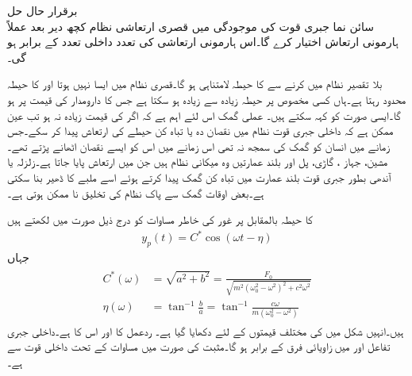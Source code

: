 \quad برقرار حال حل\\
سائن نما جبری قوت کی موجودگی میں قصری ارتعاشی نظام کچھ دیر  بعد عملاً ہارمونی ارتعاش اختیار کرے گا۔اس ہارمونی ارتعاشی کی تعدد داخلی تعدد کے برابر ہو گی۔

بلا تقصیر نظام میں   کرنے سے   کا حیطہ لامتناہی ہو گا۔قصری نظام میں ایسا نہیں ہوتا اور  کا حیطہ محدود رہتا ہے۔ہاں کسی مخصوص  پر حیطہ زیادہ سے زیادہ ہو سکتا ہے جس کا دارومدار  کی قیمت پر ہو گا۔ایسی صورت کو  کہہ سکتے ہیں۔ عملی گمک اس لئے اہم ہے کہ اگر  کی قیمت زیادہ نہ ہو تب عین ممکن ہے کہ داخلی  جبری قوت نظام میں نقصان دہ یا  تباہ کن حیطے کی ارتعاش پیدا کر سکے۔جس زمانے میں انسان کو گمک کی سمجھ نہ تھی اس زمانے میں اس کو ایسے نقصان اٹھانے پڑتے تھے۔مشین، جہاز ، گاڑی، پل اور بلند عمارتیں وہ میکانی نظام ہیں جن میں ارتعاش پایا جاتا ہے۔زلزلہ یا آندھی بطور جبری قوت  بلند عمارت میں تباہ کن گمک پیدا کرتے ہوئے اسے ملبے کا ڈھیر بنا سکتی ہے۔بعض اوقات گمک سے پاک نظام کی تخلیق نا ممکن ہوتی ہے۔

 کا حیطہ بالمقابل  پر غور کی خاطر مساوات  کو درج ذیل صورت میں لکھتے ہیں
\begin{align}\label{مساوات_سادہ_دو_برقرار_عملی_گمک_الف}
y_p(t)=C^* \cos(\omega t-\eta)
\end{align}
جہاں
\begin{gather}
\begin{aligned}\label{مساوات_سادہ_دو_حیطہ_زاویہ_الف}
C^*(\omega)&=\sqrt{a^2+b^2}=\frac{F_0}{\sqrt{m^2(\omega_0^2-\omega^2)^2+c^2\omega^2}}\\
\eta(\omega)&=\tan^{-1}\frac{b}{a}=\tan^{-1}\frac{c\omega}{m(\omega_0^2-\omega^2)}
\end{aligned}
\end{gather}
ہیں۔انہیں شکل  میں  کی مختلف قیمتوں کے لئے دکھایا گیا ہے۔ ردعمل  کا  اور  اس کا  ہے۔داخلی جبری تفاعل اور  میں زاویائی فرق  کے برابر ہو گا۔مثبت  کی صورت میں مساوات  کے تحت داخلی قوت سے   ہے۔ 

